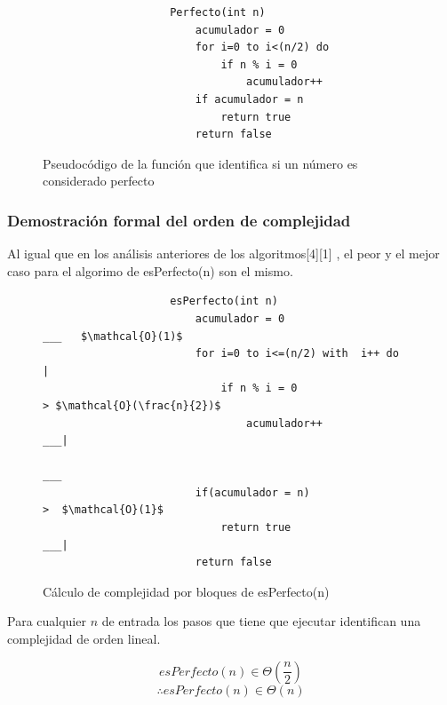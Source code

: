 \documentclass{report}
\begin{document}
            \begin{figure}[!h]
                \begin{verbatim}
                    Perfecto(int n)
                        acumulador = 0
                        for i=0 to i<(n/2) do
                            if n % i = 0
                                acumulador++
                        if acumulador = n
                            return true
                        return false
                \end{verbatim}
                \caption{Pseudocódigo de la función que identifica si un número es considerado perfecto}
                \label{fig:my_label}
            \end{figure}    
        
        \subsubsection*{Demostración formal del orden de complejidad}
            Al igual que en los análisis anteriores de los algoritmos[4][1] , el peor y el mejor caso para el algorimo de esPerfecto(n) son el mismo.
            \begin{figure}[!h]
                \begin{lstlisting}
                    esPerfecto(int n)
                        acumulador = 0                             ___   $\mathcal{O}(1)$                   
                        for i=0 to i<=(n/2) with  i++ do              |
                            if n % i = 0                               > $\mathcal{O}(\frac{n}{2})$
                                acumulador++                       ___|
                                                            ___
                        if(acumulador = n)                     >  $\mathcal{O}(1}$ 
                            return true                     ___|
                        return false
                \end{lstlisting}
                \label{fig:my_label}
                \caption{Cálculo de complejidad por bloques de esPerfecto(n)}
            \end{figure}
            Para cualquier $n$ de entrada los pasos que tiene que ejecutar identifican una complejidad de orden lineal.
            
            $$ esPerfecto(n) \in \Theta \left( \frac{n}{2} \right) $$
            $$ \therefore esPerfecto(n) \in \Theta(n) $$
            
\end{document}
